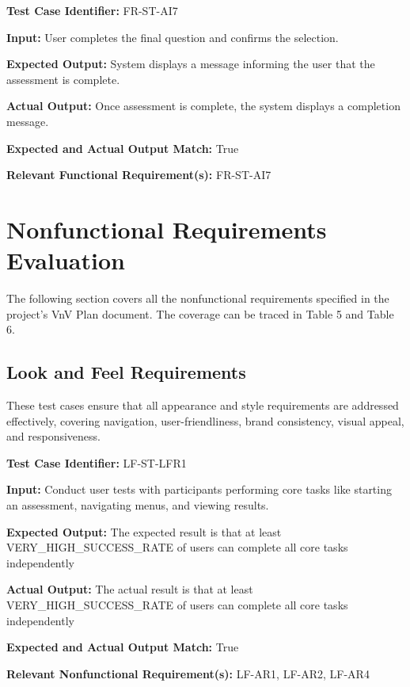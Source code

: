 \documentclass[12pt, titlepage]{article}
\begin{document}
\begin{mdframed}[linewidth=0.5mm] \par
  \textbf{Test Case Identifier:} FR-ST-AI7 \par
  \textbf{Input:} User completes the final question and confirms the selection. 
  \par
  \textbf{Expected Output:} System displays a message informing the user that the assessment is
  complete. \par
  \textbf{Actual Output:} Once assessment is complete, the system displays a completion message. \par
  \textbf{Expected and Actual Output Match:} True \par
  \textbf{Relevant Functional Requirement(s):} FR-ST-AI7
\end{mdframed}

\newpage{}

\section{Nonfunctional Requirements Evaluation}
\hspace{2em}The following section covers all the nonfunctional requirements specified in the project’s
VnV Plan document. The coverage can be traced in Table 5 and Table 6.

\subsection{Look and Feel Requirements}
\hspace{2em}These test cases ensure that all appearance and style requirements are addressed effectively, covering navigation, user-friendliness, brand consistency, visual appeal, and responsiveness.

\begin{mdframed}[linewidth=0.5mm] \par
  \textbf{Test Case Identifier:} LF-ST-LFR1 \par
  \textbf{Input:} Conduct user tests with participants performing core tasks like starting an assessment, navigating menus, and viewing results. \par
  \textbf{Expected Output:} The expected result is that at least \\VERY\_HIGH\_SUCCESS\_RATE of users can complete all core tasks independently \par
  \textbf{Actual Output:} The actual result is that at least \\VERY\_HIGH\_SUCCESS\_RATE of users can complete all core tasks independently \par
  \textbf{Expected and Actual Output Match:} True \par
  \textbf{Relevant Nonfunctional Requirement(s):} LF-AR1, LF-AR2, LF-AR4
\end{mdframed}
\end{document}
